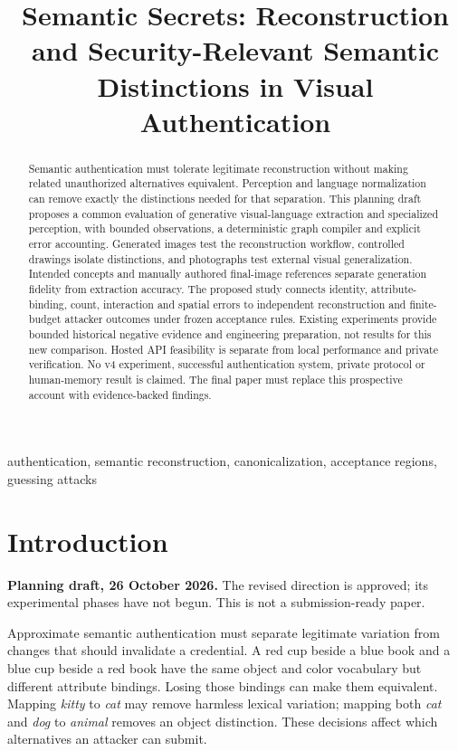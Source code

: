 \documentclass[compsoc,conference,a4paper,10pt,times]{IEEEtran}
\title{Semantic Secrets: Reconstruction and Security-Relevant Semantic Distinctions in Visual Authentication}
\author{}
\begin{document}
\maketitle
\begin{abstract}
Semantic authentication must tolerate legitimate reconstruction without making related unauthorized alternatives equivalent. Perception and language normalization can remove exactly the distinctions needed for that separation. This planning draft proposes a common evaluation of generative visual-language extraction and specialized perception, with bounded observations, a deterministic graph compiler and explicit error accounting. Generated images test the reconstruction workflow, controlled drawings isolate distinctions, and photographs test external visual generalization. Intended concepts and manually authored final-image references separate generation fidelity from extraction accuracy. The proposed study connects identity, attribute-binding, count, interaction and spatial errors to independent reconstruction and finite-budget attacker outcomes under frozen acceptance rules. Existing experiments provide bounded historical negative evidence and engineering preparation, not results for this new comparison. Hosted API feasibility is separate from local performance and private verification. No v4 experiment, successful authentication system, private protocol or human-memory result is claimed. The final paper must replace this prospective account with evidence-backed findings.
\end{abstract}
\begin{IEEEkeywords}
authentication, semantic reconstruction, canonicalization, acceptance regions, guessing attacks
\end{IEEEkeywords}

\section{Introduction}
\label{sec:introduction}
\noindent\textbf{Planning draft, 26 October 2026.} The revised direction is approved; its experimental phases have not begun. This is not a submission-ready paper.

Approximate semantic authentication must separate legitimate variation from changes that should invalidate a credential. A red cup beside a blue book and a blue cup beside a red book have the same object and color vocabulary but different attribute bindings. Losing those bindings can make them equivalent. Mapping \emph{kitty} to \emph{cat} may remove harmless lexical variation; mapping both \emph{cat} and \emph{dog} to \emph{animal} removes an object distinction. These decisions affect which alternatives an attacker can submit.
\end{document}
